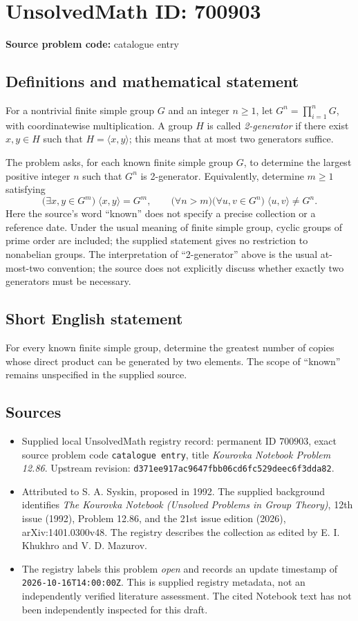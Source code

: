 \documentclass[11pt]{article}
\begin{document}
\section*{UnsolvedMath ID: 700903}
\textbf{Source problem code:} catalogue entry
\subsection{Definitions and mathematical statement}
For a nontrivial finite simple group \(G\) and an integer \(n\geq 1\), let \(G^n=\prod_{i=1}^{n}G\), with coordinatewise multiplication. A group \(H\) is called \emph{2-generator} if there exist \(x,y\in H\) such that \(H=\langle x,y\rangle\); this means that at most two generators suffice.

The problem asks, for each known finite simple group \(G\), to determine the largest positive integer \(n\) such that \(G^n\) is 2-generator. Equivalently, determine \(m\geq 1\) satisfying
\[
\bigl(\exists x,y\in G^m\bigr)\;\langle x,y\rangle=G^m,
\qquad
\bigl(\forall n>m\bigr)\bigl(\forall u,v\in G^n\bigr)\;\langle u,v\rangle\neq G^n.
\]
Here the source's word ``known'' does not specify a precise collection or a reference date. Under the usual meaning of finite simple group, cyclic groups of prime order are included; the supplied statement gives no restriction to nonabelian groups. The interpretation of ``2-generator'' above is the usual at-most-two convention; the source does not explicitly discuss whether exactly two generators must be necessary.
\subsection{Short English statement}
For every known finite simple group, determine the greatest number of copies whose direct product can be generated by two elements. The scope of ``known'' remains unspecified in the supplied source.
\subsection{Sources}
\begin{itemize}
\item Supplied local UnsolvedMath registry record: permanent ID \(700903\), exact source problem code \texttt{catalogue entry}, title \emph{Kourovka Notebook Problem 12.86}. Upstream revision: \texttt{d371ee917ac9647fbb06cd6fc529deec6f3dda82}.
\item Attributed to S. A. Syskin, proposed in 1992. The supplied background identifies \emph{The Kourovka Notebook (Unsolved Problems in Group Theory)}, 12th issue (1992), Problem 12.86, and the 21st issue edition (2026), arXiv:1401.0300v48. The registry describes the collection as edited by E. I. Khukhro and V. D. Mazurov.
\item The registry labels this problem \emph{open} and records an update timestamp of \texttt{2026-10-16T14:00:00Z}. This is supplied registry metadata, not an independently verified literature assessment. The cited Notebook text has not been independently inspected for this draft.
\end{itemize}
\end{document}
